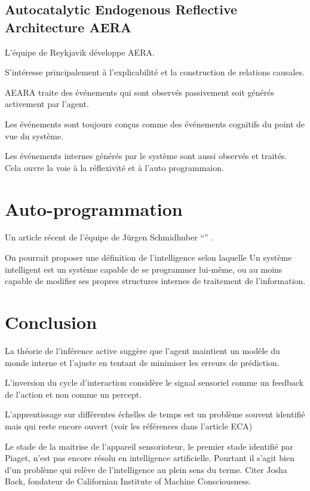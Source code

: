 \subsection{Autocatalytic Endogenous Reflective Architecture AERA}

L'équipe de Reykjavik développe AERA. 

S'intéresse principalement à l'explicabilité et la construction de relations causales. 

AEARA traite des événements qui sont observés passivement soit générés activement par l'agent. 

Les événements sont toujours conçus comme des événements cognitifs du point de vue du système.

Les événements internes générés par le système sont aussi observés et traités. 
Cela ouvre la voie à la réflexivité et à l'auto programmaion.




\section{Auto-programmation}

Un article récent de l'équipe de Jürgen Schmidhuber ``'' \cite{wang_huxley-gomachine_2025}.

On pourrait proposer une définition de l'intelligence selon laquelle Un système intelligent est un système capable de se programmer lui-même, ou au moins capable de modifier ses propres structures internes de traitement de l'information.




\section{Conclusion}


La théorie de l'inférence active suggère que l'agent maintient un modèle du monde interne et l'ajuste en tentant de minimiser les erreurs de prédiction.

L'inversion du cycle d'interaction considère le signal sensoriel comme un feedback de l'action et non comme un percept.


L'apprentissage sur différentes échelles de temps est un problème souvent identifié mais qui reste encore ouvert 
(voir les références dans l'article ECA)

Le stade de la maitrise de l'appareil sensorioteur, le premier stade identifié par Piaget, n'est pas encore résolu en intelligence artificielle. Pourtant il s'agit bien d'un problème qui relève de l'intelligence au plein sens du terme. Citer Josha Back, fondateur de Californian Institute of Machine Consciousness.



